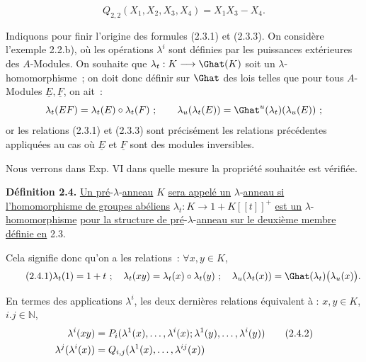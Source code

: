 
\[
  Q_{2,2}(X_1,X_2,X_3,X_4)=X_1X_3-X_4.
\]

Indiquons pour finir l'origine des formules (2.3.1) et (2.3.3). On considère l'exemple 2.2.b), où les opérations \(\lambda^i\) sont définies par les puissances extérieures des \(A\)-Modules. On souhaite que \(\lambda_t:K\longrightarrow\Ghat(K)\) soit un \(\lambda\)-homomorphisme~; on doit donc définir sur \(\Ghat\) des lois telles que pour tous \(A\)-Modules \(\underline{E},\underline{F}\), on ait~:
\[
  \lambda_t(EF)=\lambda_t(E)\circ\lambda_t(F)~;\qquad
  \lambda_u(\lambda_t(E))=\Ghat^u(\lambda_t)(\lambda_u(E))~;
\]
or les relations (2.3.1) et (2.3.3) sont précisément les relations précédentes appliquées au cas où \(\underline{E}\) et \(\underline{F}\) sont des modules inversibles.

Nous verrons dans Exp. VI dans quelle mesure la propriété souhaitée est vérifiée.

\textbf{Définition 2.4.} \uline{Un pré}-\(\lambda\)-\uline{anneau} \(K\) \uline{sera appelé un} \(\lambda\)-\uline{anneau si l'homomorphisme de groupes abéliens} \(\lambda_t:K\longrightarrow1+K[[t]]^+\) \uline{est un} \(\lambda\)-\uline{homomorphisme} \uline{pour la structure de pré}-\(\lambda\)-\uline{anneau sur le deuxième membre définie en} 2.3.

Cela signifie donc qu'on a les relations~: \(\forall x,y\in K\),
\begin{equation}\tag{2.4.1}
  \lambda_t(1)=1+t~;\quad
  \lambda_t(xy)=\lambda_t(x)\circ\lambda_t(y)~;\quad
  \lambda_u(\lambda_t(x))=\Ghat(\lambda_t)\bigl(\lambda_u(x)\bigr).
\end{equation}

En termes des applications \(\lambda^i\), les deux dernières relations équivalent à : \(x,y\in K\), \(i.j\in\mathbb N\),
\begin{align}
  \lambda^i(xy)
  &=P_i(\lambda^1(x),\ldots,\lambda^i(x);
       \lambda^1(y),\ldots,\lambda^i(y)) \tag{2.4.2}\\
  \lambda^j(\lambda^i(x))
  &=Q_{i,j}(\lambda^1(x),\ldots,\lambda^{ij}(x)) \notag
\end{align}

